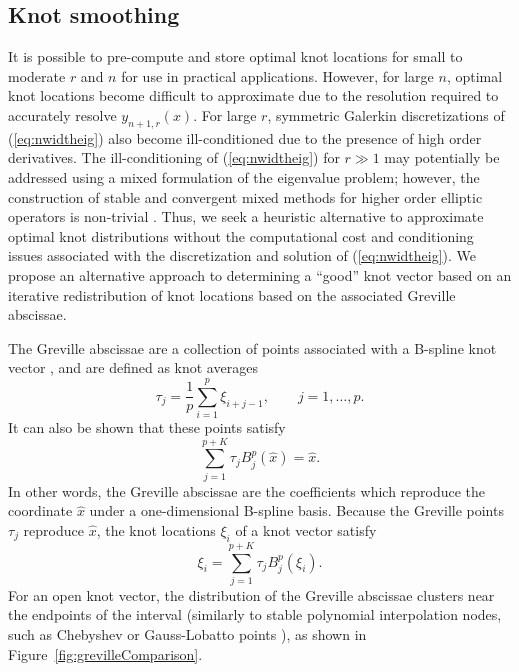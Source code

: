 \documentclass[preprint,10pt]{elsarticle}
\begin{document}
\subsection{Knot smoothing}

It is possible to pre-compute and store optimal knot locations for small to moderate $r$ and $n$ for use in practical applications.  However, for large $n$, optimal knot locations become difficult to approximate due to the resolution required to accurately resolve $y_{n+1,r}(x)$.  For large $r$, symmetric Galerkin discretizations of (\ref{eq:nwidtheig}) also become ill-conditioned due to the presence of high order derivatives.  The ill-conditioning of (\ref{eq:nwidtheig}) for $r \gg 1$ may potentially be addressed using a mixed formulation of the eigenvalue problem; however, the construction of stable and convergent mixed methods for higher order elliptic operators is non-trivial \cite{gudi2011interior}. Thus, we seek a heuristic alternative to approximate optimal knot distributions without the computational cost and conditioning issues associated with the discretization and solution of (\ref{eq:nwidtheig}).  We propose an alternative approach to determining a ``good'' knot vector based on an iterative redistribution of knot locations based on the associated Greville abscissae.  

The Greville abscissae are a collection of points associated with a B-spline knot vector \cite{johnson2005higher}, and are defined as knot averages 
\[
\tau_j = \frac{1}{p}\sum_{i=1}^p \xi_{i+j-1}, \qquad j = 1,\ldots,p.
\]  
It can also be shown that these points satisfy
\[
\sum_{j=1}^{p+K} \tau_j B^p_j(\widehat{x}) = \widehat{x}.
\]
In other words, the Greville abscissae are the coefficients which reproduce the coordinate $\widehat{x}$ under a one-dimensional B-spline basis.  Because the Greville points $\tau_j$ reproduce $\widehat{x}$, the knot locations $\xi_i$ of a knot vector satisfy 
\[
\xi_i = \sum_{j=1}^{p+K} \tau_j B^p_j(\xi_i).  
\]
For an open knot vector, the distribution of the Greville abscissae clusters near the endpoints of the interval (similarly to stable polynomial interpolation nodes, such as Chebyshev or Gauss-Lobatto points \cite{canuto2012spectral}), as shown in Figure~\ref{fig:grevilleComparison}.  
\end{document}
